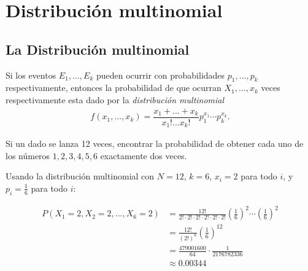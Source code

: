 \section{Distribución multinomial}
\subsection{La Distribución multinomial}

 Si los eventos $E_{1},...,E_{k}$ pueden ocurrir con probabilidades $p_{1},...,p_{k}$ respectivamente, entonces la probabilidad de que ocurran $X_{1},...,x_{k}$ veces respectivamente esta dado por la \emph{distribución multinomial}
 \begin{align}
  \label{eq:2.10.8}
  f\left( x_{1},...,x_{k} \right)=
  \dfrac{x_{1}+...+x_{k}}{x_{1}!...x_{k}!}p_{1}^{x_{1}}\cdots p_{k}^{x_{k}}.
 \end{align}



 \begin{ejemplo}
  \label{exmp:2.10.6}
Si un dado se lanza 12 veces, encontrar la probabilidad de obtener cada uno de los números $1,2,3,4,5,6$ exactamente dos veces.
 \end{ejemplo}

\begin{solucion}
	Usando la distribución multinomial con $N=12$, $k=6$, $x_i = 2$ para todo $i$, y $p_i = \frac{1}{6}$ para todo $i$:

	\begin{align}
		P(X_1=2, X_2=2, ..., X_6=2) &= \frac{12!}{2! \cdot 2! \cdot 2! \cdot 2! \cdot 2! \cdot 2!} \left(\frac{1}{6}\right)^2 \cdots \left(\frac{1}{6}\right)^2 \\
		&= \frac{12!}{(2!)^6} \left(\frac{1}{6}\right)^{12} \\
		&= \frac{479001600}{64} \cdot \frac{1}{2176782336} \\
		&\approx 0.00344
	\end{align}
\end{solucion}

